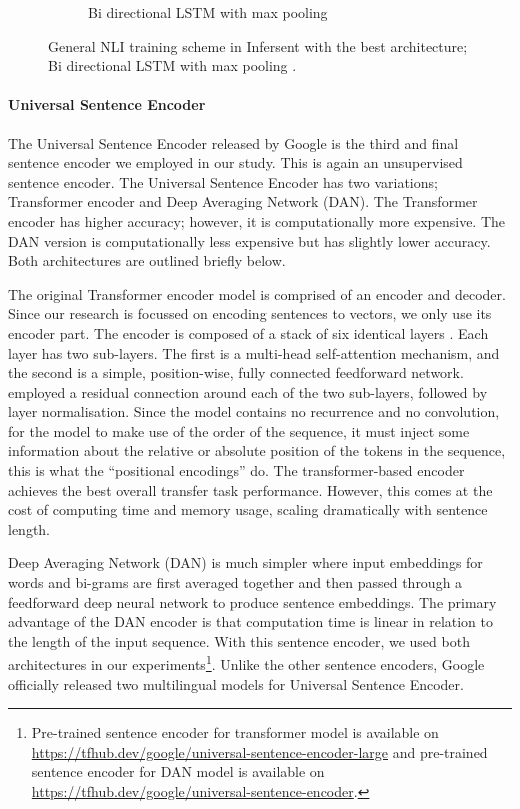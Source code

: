 \begin{figure}
\begin{subfigure}[b]{.5\textwidth}
		\caption{Bi directional LSTM  with max pooling}
		\label{fig:infersent_architecture}
	\end{subfigure}
	\caption[Infersent Architecture]{General NLI training scheme in Infersent with the best architecture; Bi directional LSTM  with max pooling \autocite{conneau-EtAl:2017:EMNLP2017}. }
	\label{fig:infersent}
\end{figure}

\paragraph{Universal Sentence Encoder}

The Universal Sentence Encoder \autocite{cer2018universal} released by Google is the third and final sentence encoder we employed in our study. This is again an unsupervised sentence encoder. The Universal Sentence Encoder has two variations; Transformer encoder and Deep Averaging Network (DAN). The Transformer encoder has higher accuracy; however, it is computationally more expensive. The DAN version is computationally less expensive but has slightly lower accuracy. Both architectures are outlined briefly below.

The original Transformer encoder model is comprised of an encoder and decoder. Since our research is focussed on encoding sentences to vectors, we only use its encoder part. The encoder is composed of a stack of six identical layers \autocite{cer2018universal}. Each layer has two sub-layers. The first is a multi-head self-attention mechanism, and the second is a simple, position-wise, fully connected feedforward network. \textcite{cer2018universal} employed a residual connection around each of the two sub-layers,
followed by layer normalisation. Since the model contains no recurrence and no convolution, for the model to make use of the order of the sequence, it must inject some information about the relative or absolute position of the tokens in the sequence, this is what the “positional encodings” do. The transformer-based encoder achieves the best overall transfer task performance. However, this comes at the cost of computing time and memory usage, scaling dramatically with sentence length.

Deep Averaging Network (DAN) is much simpler where input embeddings for words and bi-grams are first averaged together and then passed through a feedforward deep neural network to produce sentence embeddings. The primary advantage of the DAN encoder is that computation time is linear in relation to the length of the input sequence. With this sentence encoder, we used both architectures in our experiments\footnote{Pre-trained sentence encoder for transformer model is available on \url{https://tfhub.dev/google/universal-sentence-encoder-large} and pre-trained sentence encoder for DAN model is available on \url{https://tfhub.dev/google/universal-sentence-encoder}.}. Unlike the other sentence encoders, Google officially released two multilingual models for Universal Sentence Encoder.

